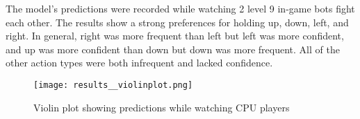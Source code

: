 The model's predictions were recorded while watching 2 level 9 in-game bots fight each other. The results show a strong preferences for holding up, down, left, and right. In general, right was more frequent than left but left was more confident, and up was more confident than down but down was more frequent. All of the other action types were both infrequent and lacked confidence.

\begin{figure}
    \caption{Violin plot showing predictions while watching CPU players}
    \centering
    \texttt{[image: results\_\_violinplot.png]} \\
\end{figure}

